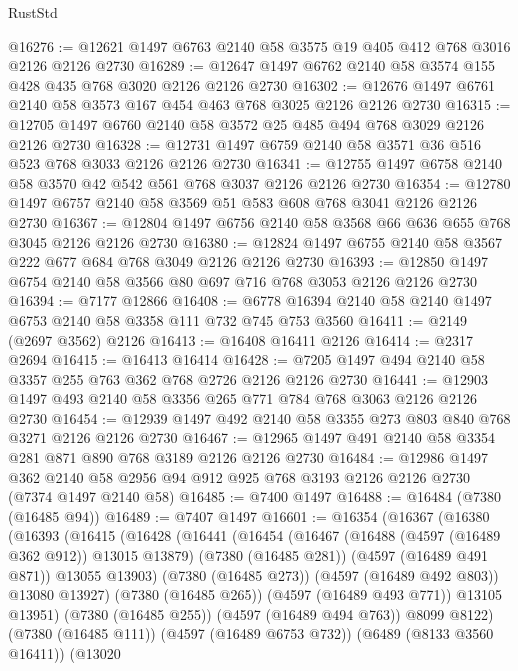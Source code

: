 \begin{lexlean}{RustStd}
\begin{coremodule}
@16276 := @12621 @1497 @6763 @2140 @58 @3575 @19 @405 @412 @768 @3016 @2126 @2126 @2730
@16289 := @12647 @1497 @6762 @2140 @58 @3574 @155 @428 @435 @768 @3020 @2126 @2126 @2730
@16302 := @12676 @1497 @6761 @2140 @58 @3573 @167 @454 @463 @768 @3025 @2126 @2126 @2730
@16315 := @12705 @1497 @6760 @2140 @58 @3572 @25 @485 @494 @768 @3029 @2126 @2126 @2730
@16328 := @12731 @1497 @6759 @2140 @58 @3571 @36 @516 @523 @768 @3033 @2126 @2126 @2730
@16341 := @12755 @1497 @6758 @2140 @58 @3570 @42 @542 @561 @768 @3037 @2126 @2126 @2730
@16354 := @12780 @1497 @6757 @2140 @58 @3569 @51 @583 @608 @768 @3041 @2126 @2126 @2730
@16367 := @12804 @1497 @6756 @2140 @58 @3568 @66 @636 @655 @768 @3045 @2126 @2126 @2730
@16380 := @12824 @1497 @6755 @2140 @58 @3567 @222 @677 @684 @768 @3049 @2126 @2126 @2730
@16393 := @12850 @1497 @6754 @2140 @58 @3566 @80 @697 @716 @768 @3053 @2126 @2126 @2730
@16394 := @7177 @12866
@16408 := @6778 @16394 @2140 @58 @2140 @1497 @6753 @2140 @58 @3358 @111 @732 @745 @753 @3560
@16411 := @2149 (@2697 @3562) @2126
@16413 := @16408 @16411 @2126
@16414 := @2317 @2694
@16415 := @16413 @16414
@16428 := @7205 @1497 @494 @2140 @58 @3357 @255 @763 @362 @768 @2726 @2126 @2126 @2730
@16441 := @12903 @1497 @493 @2140 @58 @3356 @265 @771 @784 @768 @3063 @2126 @2126 @2730
@16454 := @12939 @1497 @492 @2140 @58 @3355 @273 @803 @840 @768 @3271 @2126 @2126 @2730
@16467 := @12965 @1497 @491 @2140 @58 @3354 @281 @871 @890 @768 @3189 @2126 @2126 @2730
@16484 := @12986
    @1497
    @362
    @2140
    @58
    @2956
    @94
    @912
    @925
    @768
    @3193
    @2126
    @2126
    @2730
    (@7374 @1497 @2140 @58)
@16485 := @7400 @1497
@16488 := @16484 (@7380 (@16485 @94))
@16489 := @7407 @1497
@16601 := @16354
    (@16367
      (@16380
        (@16393
          (@16415
            (@16428
              (@16441
                (@16454
                  (@16467
                    (@16488 (@4597 (@16489 @362 @912)) @13015 @13879)
                    (@7380 (@16485 @281))
                    (@4597 (@16489 @491 @871))
                    @13055
                    @13903)
                  (@7380 (@16485 @273))
                  (@4597 (@16489 @492 @803))
                  @13080
                  @13927)
                (@7380 (@16485 @265))
                (@4597 (@16489 @493 @771))
                @13105
                @13951)
              (@7380 (@16485 @255))
              (@4597 (@16489 @494 @763))
              @8099
              @8122)
            (@7380 (@16485 @111))
            (@4597 (@16489 @6753 @732))
            (@6489 (@8133 @3560 @16411))
            (@13020

\end{coremodule}
\end{lexlean}
